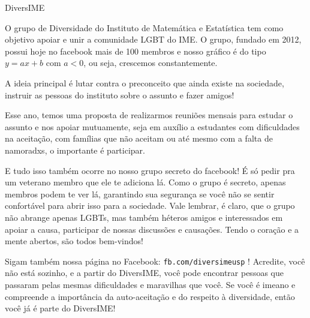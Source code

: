 \begin{subsecao}{DiversIME}

O grupo de Diversidade do Instituto de Matemática e Estatística tem como objetivo
 apoiar e unir a comunidade LGBT do IME. O grupo, fundado em 2012, possui hoje
 no facebook mais de 100 membros e nosso gráfico é do tipo $y = ax + b$ com $a < 0$,
 ou seja, crescemos constantemente.

A ideia principal é lutar contra o preconceito que ainda existe na sociedade,
 instruir as pessoas do instituto sobre o assunto e fazer amigos!

Esse ano, temos uma proposta de realizarmos reuniões mensais para estudar o
 assunto e nos apoiar mutuamente, seja em auxílio a estudantes com dificuldades
 na aceitação, com famílias que não aceitam ou até mesmo com a falta de
 namoradxs, o importante é participar.

E tudo isso também ocorre no nosso grupo secreto do facebook! É só pedir pra um
 veterano membro que ele te adiciona lá. Como o grupo é secreto, apenas membros
 podem te ver lá, garantindo sua segurança se você não se sentir confortável
 para abrir isso para a sociedade. Vale lembrar, é claro, que o grupo não
 abrange apenas LGBTs, mas também héteros amigos e interessados em apoiar
 a causa, participar de nossas discussões e causações. Tendo o coração e a mente
 abertos, são todos bem-vindos!

Sigam também nossa página no Facebook: {\tt fb.com/diversimeusp} !
Acredite, você não está sozinho, e a partir do DiversIME, você pode encontrar
 pessoas que passaram pelas mesmas dificuldades e maravilhas que você. Se você
 é imeano e compreende a importância da auto-aceitação e do respeito à
 diversidade, então você já é parte do DiversIME!

\end{subsecao}

